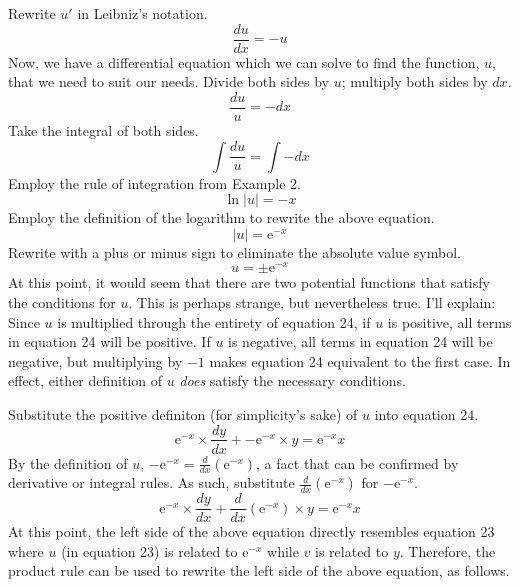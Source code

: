 \documentclass{article}
\begin{document}
Rewrite $u'$ in Leibniz's notation.
\begin{equation*}
    \frac{du}{dx}=-u
\end{equation*}
Now, we have a differential equation which we can solve to find the function, $u$, that we need to suit our needs. Divide both sides by $u$; multiply both sides by $dx$.
\begin{equation*}
    \frac{du}{u}=-dx
\end{equation*}
Take the integral of both sides.
\begin{equation*}
    \int \frac{du}{u}=\int -dx
\end{equation*}
Employ the rule of integration from Example 2.
\begin{equation*}
    \ln|u|=-x
\end{equation*}
Employ the definition of the logarithm to rewrite the above equation.
\begin{equation*}
    |u|=\text{e}^{-x}
\end{equation*}
Rewrite with a plus or minus sign to eliminate the absolute value symbol.
\begin{equation*}
    u=\pm\text{e}^{-x}
\end{equation*}
At this point, it would seem that there are two potential functions that satisfy the conditions for $u$. This is perhaps strange, but nevertheless true. I'll explain: Since $u$ is multiplied through the entirety of equation 24, if $u$ is positive, all terms in equation 24 will be positive. If $u$ is negative, all terms in equation 24 will be negative, but multiplying by $-1$ makes equation 24 equivalent to the first case. In effect, either definition of $u$ \emph{does} satisfy the necessary conditions.\par
Substitute the positive definiton (for simplicity's sake) of $u$ into equation 24.
\begin{equation*}
    \text{e}^{-x}\times\frac{dy}{dx}+-\text{e}^{-x}\times y=\text{e}^{-x}x
\end{equation*}
By the definition of $u$, $-\text{e}^{-x}=\frac{d}{dx}\left(\text{e}^{-x}\right)$, a fact that can be confirmed by derivative or integral rules. As such, substitute $\frac{d}{dx}\left(\text{e}^{-x}\right)$ for $-\text{e}^{-x}$.
\begin{equation*}
    \text{e}^{-x}\times\frac{dy}{dx}+\frac{d}{dx}\left(\text{e}^{-x}\right)\times y=\text{e}^{-x}x
\end{equation*}
At this point, the left side of the above equation directly resembles equation 23 where $u$ (in equation 23) is related to $\text{e}^{-x}$ while $v$ is related to $y$. Therefore, the product rule can be used to rewrite the left side of the above equation, as follows.
\end{document}
